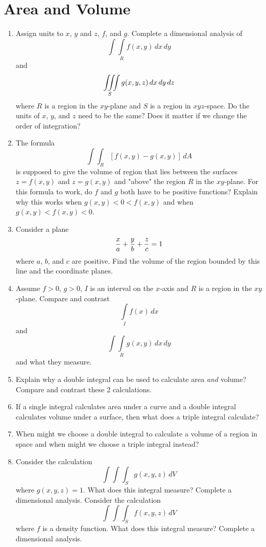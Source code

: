 \section{Area and Volume}
\begin{enumerate}    

\item  Assign units to $x$, $y$ and $z$, $f$, and $g$.  Complete a dimensional analysis of $$ \int\!\!\!\int\limits_R {f(x,y)\,dx\,dy}  $$  and $$ \mathop{\int\!\!\!\int\!\!\!\int}\limits_{\kern-5.5pt S}   {g(x,y,z)} \,dx\,dy\,dz $$  where $R$ is a region in the $xy$-plane and $S$ is a region in $xyz$-space.  Do the units of $x$, $y$, and $z$ need to be the same?  Does it matter if we change the order of integration?  

\item  The formula $$ \int\!\!\!\int_R {\left[ {f\left( {x,y} \right) - g\left( {x,y} \right)} \right]\,dA}  $$  is supposed to give the volume of region that lies between the surfaces $z = f(x, y)$ and $z = g(x, y)$ and "above" the region $R$ in the $xy$-plane.  For this formula to work, do $f$ and $g$ both have to be positive functions?  Explain why this works when $g(x, y) < 0 < f(x, y)$ and when $g(x, y) < f(x, y) < 0$.  

\item  Consider a plane $$ {x \over a} + {y \over b} + {z \over c} = 1 $$  where $a$, $b$, and $c$ are positive.  Find the volume of the region bounded by this line and the coordinate planes.  

\item  Assume $f > 0$, $g > 0$, $I$ is an interval on the $x$-axis and $R$ is a region in the $xy$-plane.  Compare and contrast $$ \int\limits_I {f(x)\,dx}  $$  and $$ \int\!\!\!\int\limits_R {g(x,y)\,dx\,dy}  $$  and what they measure.  

\item  Explain why a double integral can be used to calculate area {\emph{and}} volume?  Compare and contrast these 2 calculations.  

\item  If a single integral calculates area under a curve and a double integral calculates volume under a surface, then what does a triple integral calculate?  

\item  When might we choose a double integral to calculate a volume of a region in space and when might we choose a triple integral instead?  

\item  Consider the calculation$$ \int\!\!\!\int\!\!\!\int_S   {g(x,y,z)\,dV}  $$  where $g(x, y, z) = 1$. What does this integral measure?  Complete a dimensional analysis.  Consider the calculation$$ \int\!\!\!\int\!\!\!\int_S   {f(x,y,z)\,dV}  $$  where $f$ is a density function.  What does this integral measure?  Complete a dimensional analysis.  

\end{enumerate}
